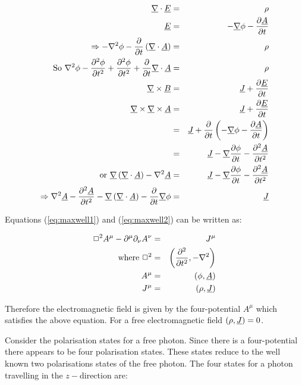 \begin{eqnarray}
  \underline{\nabla}\cdot\underline{E} & = & \rho \nonumber \\
  \underline{E}  & = & -\underline{\nabla}\phi - \frac{\partial \underline{A}}{\partial t} \nonumber \\
  \Rightarrow -\nabla^2\phi - \frac{\partial}{\partial t}\left(\underline{\nabla}\cdot\underline{A}\right) & = & \rho \nonumber \\
  \textrm{So } \nabla^2\phi - \frac{\partial^2\phi}{\partial t^2} + \frac{\partial^2\phi}{\partial t^2} + \frac{\partial}{\partial t}\underline{\nabla}\cdot\underline{A} & = & \rho \label{eq:maxwell1} \\
  \underline{\nabla}\times\underline{B} & = & \underline{J} + \frac{\partial \underline{E}}{\partial t} \nonumber \\
  \underline{\nabla}\times\underline{\nabla}\times\underline{A} & = & \underline{J} + \frac{\partial \underline{E}}{\partial t} \nonumber \\
  & = & \underline{J} + \frac{\partial}{\partial t}\left(-\underline{\nabla}\phi - \frac{\partial \underline{A}}{\partial t}\right) \nonumber \\
  & = & \underline{J} - \underline{\nabla}\frac{\partial\phi}{\partial t} - \frac{\partial^2\underline{A}}{\partial t^2} \nonumber \\
  \textrm{or } \underline{\nabla}\left(\underline{\nabla}\cdot\underline{A}\right) - \nabla^2\underline{A} & = & \underline{J} - \underline{\nabla}\frac{\partial \phi}{\partial t} - \frac{\partial^2 \underline{A}}{\partial t^2} \nonumber \\
  \Rightarrow \nabla^2\underline{A} - \frac{\partial^2\underline{A}}{\partial t^2} - \underline{\nabla}\left(\underline{\nabla}\cdot\underline{A}\right) - \frac{\partial}{\partial t}\underline{\nabla}\phi & = & \underline{J} \label{eq:maxwell2} \\
\end{eqnarray}

Equations (\ref{eq:maxwell1}) and (\ref{eq:maxwell2}) can be written as:

\begin{eqnarray*}
  \Box^2A^{\mu} - \partial^{\mu}\partial_{\nu}A^{\nu} & = & J^{\mu} \\
  \textrm{where } \Box^2 & = & \left(\frac{\partial^2}{\partial t^2},-\nabla^2\right) \\
  A^{\mu} & = & \left(\phi,\underline{A}\right) \\
  J^{\mu} & = & \left(\rho,\underline{J}\right)
\end{eqnarray*}

Therefore the electromagnetic field is given by the four-potential $A^{\mu}$ which satisfies the above equation.  For a free electromagnetic field $\left(\rho,\underline{J}\right) = 0$.

Consider the polarisation states for a free photon.  Since there is a four-potential there appears to be four polarisation states.  These states reduce to the well known two polarisations states of the free photon.  The four states for a photon travelling in the $z-$direction are:

